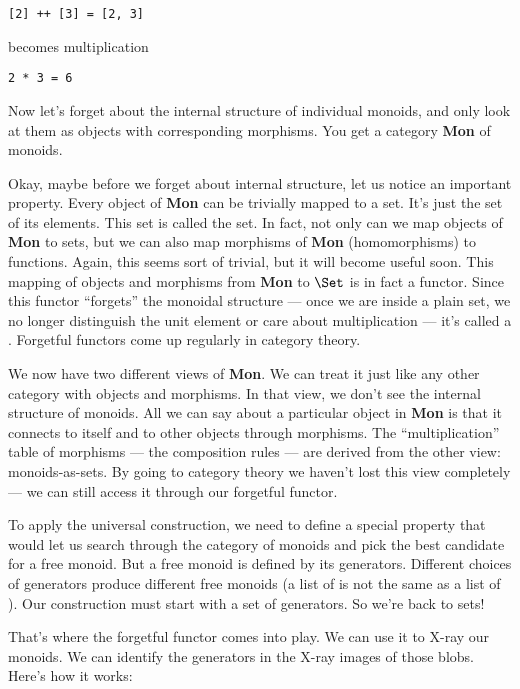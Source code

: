 \begin{Verbatim}[commandchars=\\\{\}]
[2] ++ [3] = [2, 3]
\end{Verbatim}
becomes multiplication

\begin{Verbatim}[commandchars=\\\{\}]
2 * 3 = 6
\end{Verbatim}
Now let's forget about the internal structure of individual monoids, and
only look at them as objects with corresponding morphisms. You get a
category \textbf{Mon} of monoids.

Okay, maybe before we forget about internal structure, let us notice an
important property. Every object of \textbf{Mon} can be trivially mapped
to a set. It's just the set of its elements. This set is called the
 set. In fact, not only can we map objects of
\textbf{Mon} to sets, but we can also map morphisms of \textbf{Mon}
(homomorphisms) to functions. Again, this seems sort of trivial, but it
will become useful soon. This mapping of objects and morphisms from
\textbf{Mon} to $\Set$ is in fact a functor. Since this functor
``forgets'' the monoidal structure --- once we are inside a plain set,
we no longer distinguish the unit element or care about multiplication
--- it's called a . Forgetful functors come up
regularly in category theory.

We now have two different views of \textbf{Mon}. We can treat it just
like any other category with objects and morphisms. In that view, we
don't see the internal structure of monoids. All we can say about a
particular object in \textbf{Mon} is that it connects to itself and to
other objects through morphisms. The ``multiplication'' table of
morphisms --- the composition rules --- are derived from the other view:
monoids-as-sets. By going to category theory we haven't lost this view
completely --- we can still access it through our forgetful functor.

To apply the universal construction, we need to define a special
property that would let us search through the category of monoids and
pick the best candidate for a free monoid. But a free monoid is defined
by its generators. Different choices of generators produce different
free monoids (a list of  is not the same as a list of
). Our construction must start with a set of generators. So
we're back to sets!

That's where the forgetful functor comes into play. We can use it to
X-ray our monoids. We can identify the generators in the X-ray images of
those blobs. Here's how it works:

